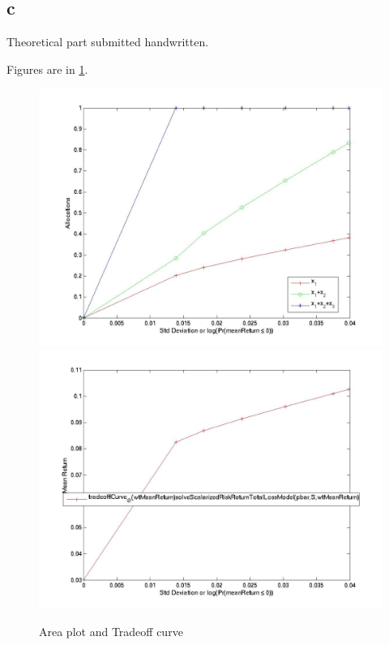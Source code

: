 \documentclass{article}
\begin{document}
\subsection{c}
Theoretical part submitted handwritten.

Figures are in \ref{fig:results1c}.

\begin{figure}[h!]
\includegraphics[scale=0.15]{log/portfolio/allocationCurves_@(wtMeanReturn)solveScalarizedRiskReturnTotalLossModel(pbar,S,wtMeanReturn)2010-05-09-16:02:56:357.jpg}
\includegraphics[scale=0.152]{log/portfolio/tradeoffCurve_@(wtMeanReturn)solveScalarizedRiskReturnTotalLossModel(pbar,S,wtMeanReturn)2010-05-09-16:02:54:771.jpg}
\label{fig:results1c}
\caption{Area plot and Tradeoff curve}
\end{figure}
\end{document}
